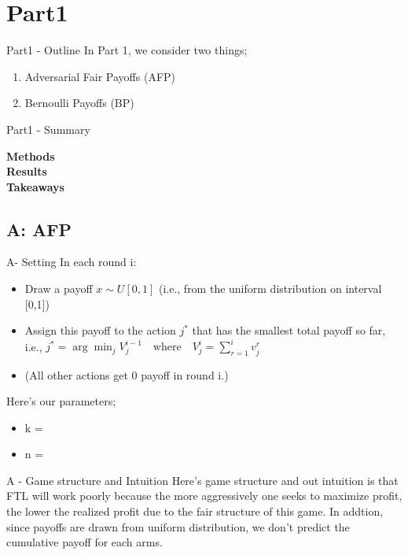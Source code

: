 \documentclass{beamer}
\begin{document}
\section{Part1}
\begin{frame}{Part1 - Outline}
In Part 1, we consider two things;
\begin{enumerate}
    \item Adversarial Fair Payoffs (AFP) 
    \item Bernoulli Payoffs (BP)
\end{enumerate}
\end{frame}

\begin{frame}{Part1 - Summary}

\textbf{Methods}\\

\textbf{Results}\\

\textbf{Takeaways}\\

\end{frame}

\subsection{A: AFP}

\begin{frame}{A- Setting}
    In each round i:
    \begin{itemize}
        \item Draw a payoff $x \sim U[0,1]$ (i.e., from the uniform distribution on interval [0,1])
        \item Assign this payoff to the action $j^*$ that has the smallest total payoff so far,\\
        i.e., $j^* = \arg\min_j V^{i-1}_{j} \quad \text{where} \quad V^{i}_{j} = \sum_{r=1}^{i} v^{r}_{j}$
        \item (All other actions get 0 payoff in round i.)
    \end{itemize}
    \vspace{1em}
    Here's our parameters;
    \begin{itemize}
        \item k = 
        \item n = 
    \end{itemize}
\end{frame}

\begin{frame}{A - Game structure and Intuition}
    Here's game structure and out intuition is that FTL will work poorly because the more aggressively one seeks to maximize profit, the lower the realized profit due to the fair structure of this game. In addtion, since payoffs are drawn from uniform distribution, we don't predict the cumulative payoff for each arms.
    
    
\end{frame}
\end{document}
